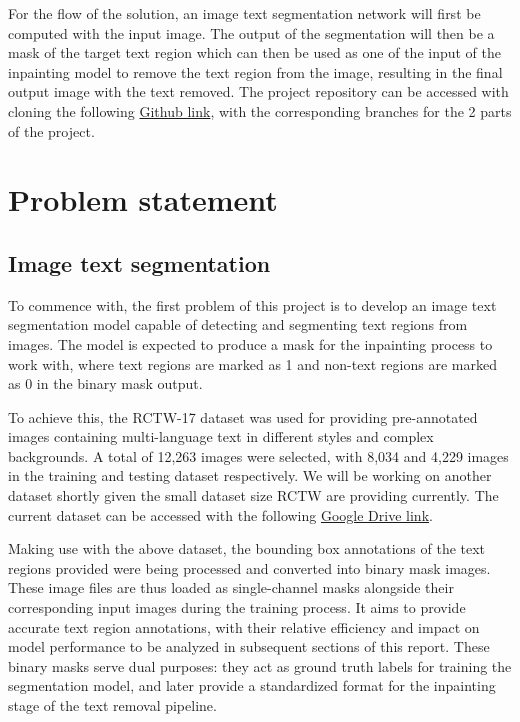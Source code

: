 \documentclass[10pt,twocolumn,letterpaper]{article}
\begin{document}
For the flow of the solution, an image text segmentation network will first be computed with the input image.
The output of the segmentation will then be a mask of the target text region which can then be used as one of the input of the 
inpainting model to remove the text region from the image, resulting in the final output image with the text removed. The 
project repository can be accessed with cloning the following \href{https://github.com/GLGDLY/ELEC4240_project}{Github link}, 
with the corresponding branches for the 2 parts of the project.

\section{Problem statement}

\subsection{Image text segmentation}
To commence with, the first problem of this project is to develop an image text segmentation model capable of detecting and segmenting text regions from images. 
The model is expected to produce a mask for the inpainting process to work with, where text regions are marked as 1 and non-text regions are marked as 0 in the binary mask output.

To achieve this, the RCTW-17 dataset was used for providing pre-annotated images containing multi-language text in different styles and complex backgrounds.
A total of 12,263 images were selected, with 8,034 and 4,229 images in the training and testing dataset respectively. 
We will be working on another dataset shortly given the small dataset size RCTW are providing currently. The current dataset can be accessed with the following 
\href{https://drive.google.com/drive/folders/1BbLe23KN1At6xsItvBcj9dXhPv6LdQH_?usp=sharing}{Google Drive link}.

Making use with the above dataset, the bounding box annotations of the text regions provided were being processed and converted into binary mask images.
These image files are thus loaded as single-channel masks alongside their corresponding input images during the training process. 
It aims to provide accurate text region annotations, with their relative efficiency and impact on model performance to be analyzed in subsequent sections of this report. 
These binary masks serve dual purposes: they act as ground truth labels for training the segmentation model, and later provide a standardized format for the inpainting stage of the text removal pipeline.
\end{document}
